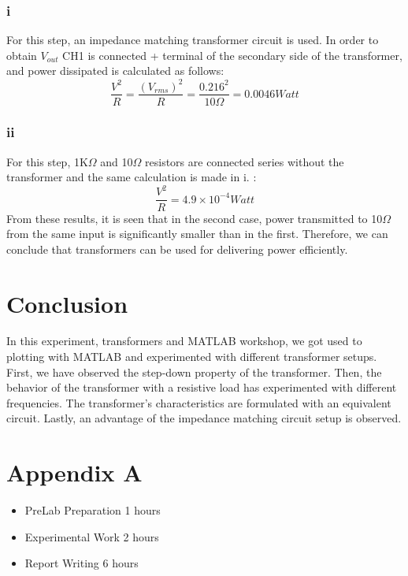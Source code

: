 \documentclass[letterpaper,12pt]{article}
\begin{document}
\subsubsection{i}
For this step, an impedance matching transformer circuit is used. In order to obtain \(V_{out}\) CH1 is connected + terminal of the secondary side of the transformer, and power dissipated is calculated as follows:
\[\frac{V^2}{R} = \frac{(V_{rms})^2}{R} = \frac{0.216^2}{10\Omega } = 0.0046 Watt\]   

\subsubsection{ii}
For this step, 1K\(\Omega \) and 10\(\Omega \) resistors are connected series without the transformer and the same calculation is made in i. :
\[\frac{V^2}{R} = 4.9 \times 10^{-4} Watt\]
From these results, it is seen that in the second case, power transmitted to 10\(\Omega \) from the same input is significantly smaller than in the first. Therefore, we can conclude that transformers can be used for delivering power efficiently. 

\section{Conclusion}
In this experiment, transformers and MATLAB workshop, we got used to plotting with MATLAB and experimented with different transformer setups. First, we have observed the step-down property of the transformer. Then, the behavior of the transformer with a resistive load has experimented with different frequencies. The transformer's characteristics are formulated with an equivalent circuit. Lastly, an advantage of the impedance matching circuit setup is observed.
\section*{Appendix A}
\begin{itemize}
    \item PreLab Preparation 1 hours
    \item Experimental Work 2  hours
    \item Report Writing 6 hours
\end{itemize}
\end{document}
